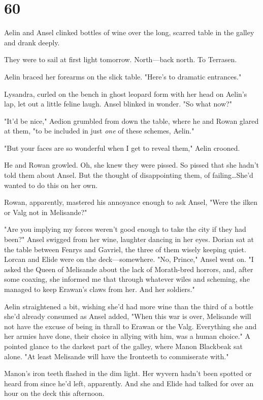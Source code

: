 
\chapter{60}

Aelin and Ansel clinked bottles of wine over the long, scarred table in the galley and drank deeply.

They were to sail at first light tomorrow.
North---back north.
To Terrasen.

Aelin braced her forearms on the slick table.
"Here's to dramatic entrances."

Lysandra, curled on the bench in ghost leopard form with her head on Aelin's lap, let out a little feline laugh.
Ansel blinked in wonder.
"So what now?"

"It'd be nice," Aedion grumbled from down the table, where he and Rowan glared at them, "to be included in just \emph{one} of these schemes, Aelin."

"But your faces are so wonderful when I get to reveal them," Aelin crooned.

He and Rowan growled.
Oh, she knew they were pissed.
So pissed that she hadn't told them about Ansel.
But the thought of disappointing them, of failing\ldots She'd wanted to do this on her own.

Rowan, apparently, mastered his annoyance enough to ask Ansel, "Were the ilken or Valg not in Melisande?"

"Are you implying my forces weren't good enough to take the city if they had been?"
Ansel swigged from her wine, laughter dancing in her eyes.
Dorian sat at the table between Fenrys and Gavriel, the three of them wisely keeping quiet.
Lorcan and Elide were on the deck---somewhere.
"No, Prince," Ansel went on.
"I asked the Queen of Melisande about the lack of Morath-bred horrors, and, after some coaxing, she informed me that through whatever wiles and scheming, she managed to keep Erawan's claws from her.
And her soldiers."

Aelin straightened a bit, wishing she'd had more wine than the third of a bottle she'd already consumed as Ansel added, "When this war is over, Melisande will not have the excuse of being in thrall to Erawan or the Valg.
Everything she and her armies have done, their choice in allying with him, was a human choice."
A pointed glance to the darkest part of the galley, where Manon Blackbeak sat alone.
"At least Melisande will have the Ironteeth to commiserate with."

Manon's iron teeth flashed in the dim light.
Her wyvern hadn't been spotted or heard from since he'd left, apparently.
And she and Elide had talked for over an hour on the deck this afternoon.

